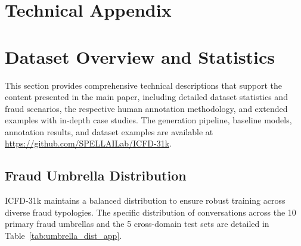 \documentclass{article}
\newcommand{\crchange}[1]{{\color{blue}#1}}
\begin{document}
\section*{Technical Appendix}


\section{Dataset Overview and Statistics}
\label{app:overview}

This section provides comprehensive technical descriptions that support the content presented in the main paper, including detailed dataset statistics and fraud scenarios, the respective human annotation methodology, and extended examples with in-depth case studies. \crchange{The generation pipeline, baseline models, annotation results, and dataset examples are available at \url{https://github.com/SPELLAILab/ICFD-31k}.}

\subsection{Fraud Umbrella Distribution}

ICFD-31k maintains a balanced distribution to ensure robust training across diverse fraud typologies. The specific distribution of conversations across the 10 primary fraud umbrellas and the 5 cross-domain test sets are detailed in Table~\ref{tab:umbrella_dist_app}.
\end{document}
